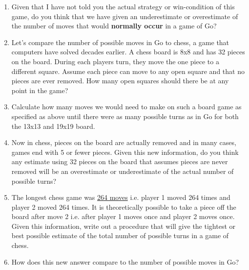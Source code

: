 \documentclass{article}
\begin{document}
\begin{enumerate}
\begin{enumerate}
        \item Given that I have not told you the actual strategy or win-condition of this game, do you think that we have given an underestimate or overestimate of the number of moves that would \textbf{normally occur} in a game of Go?
        \item Let's compare the number of possible moves in Go to chess, a game that computers have solved decades earlier. A chess board is 8x8 and has 32 pieces on the board. During each players turn, they move the one piece to a different square. Assume each piece can move to any open square and that no pieces are ever removed. How many open squares should there be at any point in the game?
        \item Calculate how many moves we would need to make on such a board game as specified as above until there were as many possible turns as in Go for both the 13x13 and 19x19 board.
        \item Now in chess, pieces on the board are actually removed and in many cases, games end with 5 or fewer pieces. Given this new information, do you think any estimate using 32 pieces on the board that assumes pieces are never removed will be an overestimate or underestimate of the actual number of possible turns?
        \item The longest chess game was \href{https://en.wikipedia.org/wiki/List_of_world_records_in_chess#Longest_game}{264 moves} i.e. player 1 moved 264 times and player 2 moved 264 times. It is theoretically possible to take a piece off the board after move 2 i.e. after player 1 moves once and player 2 moves once. Given this information, write out a procedure that will give the tightest or best possible estimate of the total number of possible turns in a game of chess.
        \item How does this new answer compare to the number of possible moves in Go?
    \end{enumerate}
    

\end{enumerate}
\end{document}
